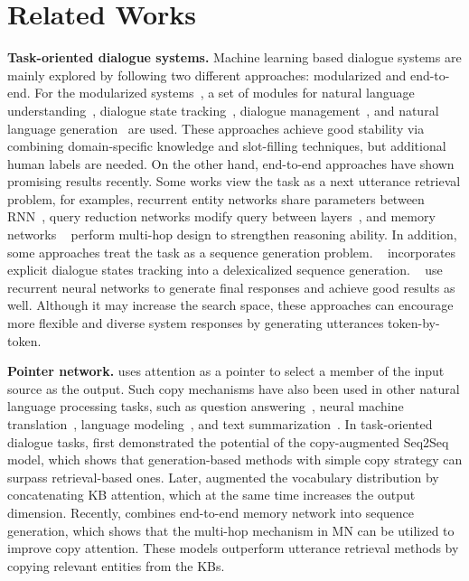 \documentclass{article} \usepackage{iclr2019_conference,times}
\begin{document}
\section{Related Works}
\textbf{Task-oriented dialogue systems.}
Machine learning based dialogue systems are mainly explored by following two different approaches: modularized and end-to-end. For the modularized systems~\citep{williams2007partially, wen2016network}, a set of modules for natural language understanding~\citep{young2013pomdp, chen2016end}, dialogue state tracking~\citep{lee2016task, zhong2018global}, dialogue management~\citep{su2016line}, and natural language generation~\citep{sharma2016natural} are used. These approaches achieve good stability via combining domain-specific knowledge and slot-filling techniques, but additional human labels are needed. On the other hand, end-to-end approaches have shown promising results recently. Some works view the task as a next utterance retrieval problem, for examples, recurrent entity networks share parameters between RNN~\citep{wu2017dstc6}, query reduction networks modify query between layers~\citep{seo2016query}, and memory networks ~\citep{bordes2016learning, perez2016gated,dqmem8461426} perform multi-hop design to strengthen reasoning ability. In addition, some approaches treat the task as a sequence generation problem. ~\cite{lei2018sequicity} incorporates explicit dialogue states tracking into a delexicalized sequence generation. ~\cite{serban2016building,zhao2017generative} use recurrent neural networks to generate final responses and achieve good results as well. Although it may increase the search space, these approaches can encourage more flexible and diverse system responses by generating utterances token-by-token.

\textbf{Pointer network.}
\cite{vinyals2015pointer} uses attention as a pointer to select a member of the input source as the output. Such copy mechanisms have also been used in other natural language processing tasks, such as question answering~\citep{Dehghani2017, heEtAl2017Long1}, neural machine translation~\citep{gulcehreEtAl2016,guEtAl2016}, language modeling~\citep{merity2016pointer}, and text summarization~\citep{seeliumanning2017Long}. In task-oriented dialogue tasks, \cite{eric-manning:2017:EACLshort} first demonstrated the potential of the copy-augmented Seq2Seq model, which shows that generation-based methods with simple copy strategy can surpass retrieval-based ones. Later, \cite{ericKVR2017} augmented the vocabulary distribution by concatenating KB attention, which at the same time increases the output dimension. Recently, \cite{mem2seq} combines end-to-end memory network into sequence generation, which shows that the multi-hop mechanism in MN can be utilized to improve copy attention. These models outperform utterance retrieval methods by copying relevant entities from the KBs.
\end{document}
